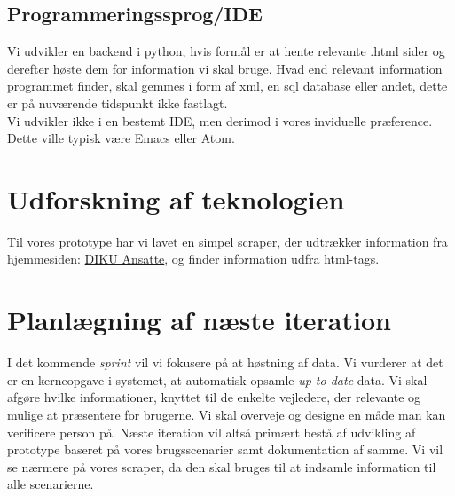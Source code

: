 \documentclass[11pt]{article}
\begin{document}
\subsection{Programmeringssprog/IDE}
Vi udvikler en backend i python, hvis formål er at hente relevante .html sider og derefter høste dem for information vi skal bruge. Hvad end relevant information programmet finder, skal gemmes i form af xml, en sql database eller andet, dette er på nuværende tidspunkt ikke fastlagt. \\
Vi udvikler ikke i en bestemt IDE, men derimod i vores inviduelle præference. Dette ville typisk være Emacs eller Atom.
\section{Udforskning af teknologien}

Til vores prototype har vi lavet en simpel scraper, der udtrækker information fra hjemmesiden: \href{http://www.diku.dk/Ansatte}{DIKU Ansatte}, og finder information udfra html-tags.

\section{Planlægning af næste iteration}
I det kommende \textit{sprint} vil vi fokusere på at høstning af data. Vi vurderer at det er en kerneopgave i systemet, at automatisk opsamle \textit{up-to-date} data. Vi skal afgøre hvilke informationer, knyttet til de enkelte vejledere, der relevante og mulige at præsentere for brugerne.
Vi skal overveje og designe en måde man kan verificere person på.
Næste iteration vil altså primært bestå af udvikling af prototype baseret på vores brugsscenarier samt dokumentation af samme. Vi vil se nærmere på vores scraper, da den skal bruges til at indsamle information til alle scenarierne.
\end{document}
